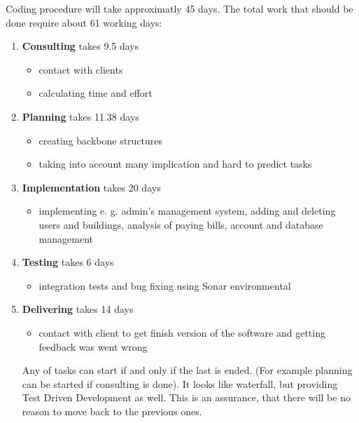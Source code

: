 \documentclass[a4paper,10pt]{report}
\begin{document}
Coding procedure will take approximatly 45 days.  The total work that should be done require about 61 working days:
\begin{enumerate}
  \item \textbf{Consulting} takes 9.5 days
  
  \begin{itemize}
  \item contact with clients
  \item calculating time and effort
  \end{itemize}

  \item \textbf{Planning} takes 11.38 days 
  
  \begin{itemize}
  \item creating backbone structures
  \item taking into account many implication and hard to predict tasks
  \end{itemize}
  
  \item \textbf{Implementation} takes 20 days 
 
  \begin{itemize}
  \item implementing e. g. admin’s management system, adding and deleting users and buildings,
	analysis of paying bills, account and database management

  \end{itemize}

  \item \textbf{Testing}  takes 6 days 
  
  \begin{itemize}
  \item integration tests and bug fixing using Sonar environmental
  \end{itemize}
  
  \item \textbf{Delivering} takes 14 days
  
  \begin{itemize}
  \item contact with client to get finish version of the software and getting feedback was went wrong
  \end{itemize}
  
  Any of tasks can start if and only if the last is ended. (For example planning can be started if consulting is done). It looks like waterfall, but providing Test Driven Development as well. This is an assurance, that there will be no reason to move back to the previous ones. 
  
\end{enumerate}
\end{document}
